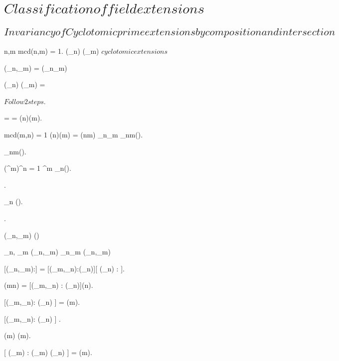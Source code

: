 \documentclass[a5paper]{book}
\begin{document}
\section{ $ Classification of field extensions $ }
{
	
	\subsection{ $ Invariancy of Cyclotomic prime extensions by composition and intersection $ }
	
	{
		n,m \in \N \suchthat mcd(n,m) = 1.
		\Q(\zeta_n) \extends \Q(\zeta_m) $ cyclotomic extensions $
	}
	\proposition
	{
		\Q(\zeta_n,\zeta_m) = \Q(\zeta_n\zeta_m)

		\Q(\zeta_n) \cap \Q(\zeta_m) = \Q
	}
	\demonstration
	{
		$ Follow 2 steps $.
		
		{
			\rightinclusion
			{
				 =  = \phin(n)\phin(m).

				mcd(m,n) = 1 \imp \phin(n)\phin(m) = \phin(nm) \imp \zeta_n\zeta_m \in \mu_{nm}(\C).

				 \in \mu_{nm}(\C).

				(\zeta^m)^n = 1 \imp \zeta^m \in \mu_n(\C).

				.

				\zeta_n \in \Q(\zeta).

				\similarly{ \zeta_m \in \Q(\zeta) }.

				\Q(\zeta_n,\zeta_m) \subset \Q(\zeta) 
			}
			\leftinclusion
			{
				\zeta_n, \zeta_m \in \Q(\zeta_n,\zeta_m) \imp \zeta_n\zeta_m \in \Q(\zeta_n,\zeta_m)
			}
		}
		
		\step{ 2 }{ \Q(\zeta_n) \cap \Q(\zeta_m) = \Q }
		{
			[\Q(\zeta_n,\zeta_m):\Q] = [\Q(\zeta_m,\zeta_n):\Q(\zeta_n)][ \Q(\zeta_n) : \Q].

			\phin(mn) = [\Q(\zeta_m,\zeta_n) : \Q(\zeta_n)]\phin(n).

			[\Q(\zeta_m,\zeta_n): \Q(\zeta_n) ] = \phin(m).

			[\Q(\zeta_m,\zeta_n): \Q(\zeta_n) ]  \leq [\Q(\zeta_m) : \Q ].

			\phin(m)  \leq \phin(m).

			[ \Q(\zeta_m) : \Q(\zeta_m) \cap \Q(\zeta_n) ] = \phin(m).

}}}
\end{document}
